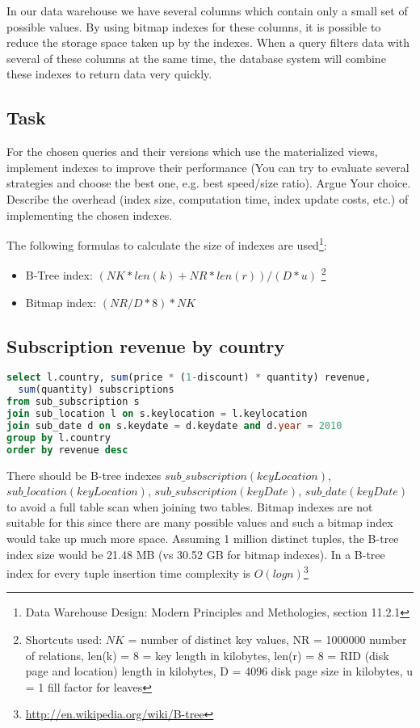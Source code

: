 In our data warehouse we have several columns which contain only a small set of possible values. By using bitmap indexes for these columns, it is possible to reduce the storage space taken up by the indexes. When a query filters data with several of these columns at the same time, the database system will combine these indexes to return data very quickly.


\subsection*{Task} 
For the chosen queries and their versions which use the materialized views,
implement indexes to improve their performance (You can try to evaluate
several strategies and choose the best one, e.g. best speed/size ratio).
Argue Your choice. Describe the overhead (index size, computation time,
index update costs, etc.) of implementing the chosen indexes.\newline

\noindent The following formulas to calculate the size of indexes are used\footnote{Data Warehouse Design: Modern Principles and Methologies, section 11.2.1}: 
\begin{itemize}
    \item B-Tree index: $(NK*len(k)+NR*len(r))/(D*u)$ \footnote{
Shortcuts used: $NK$ = number of distinct key values, NR = 1000000 number of relations, len(k) = 8 = key length in kilobytes, len(r) = 8 = RID (disk page and location) length in kilobytes, D = 4096 disk page size in kilobytes, u = 1 fill factor for leaves}
    \item Bitmap index: $(NR/D*8)*NK$
\end{itemize}

\subsection*{Subscription revenue by country} 
\begin{lstlisting}[language=sql]
select l.country, sum(price * (1-discount) * quantity) revenue, 
  sum(quantity) subscriptions 
from sub_subscription s 
join sub_location l on s.keylocation = l.keylocation 
join sub_date d on s.keydate = d.keydate and d.year = 2010
group by l.country 
order by revenue desc
\end{lstlisting}

There should be B-tree indexes $sub\_subscription(keyLocation)$, $sub\_location(keyLocation)$, $sub\_subscription(keyDate)$, $sub\_date(keyDate)$ to avoid a full table scan when joining two tables. 
Bitmap indexes are not suitable for this since there are many possible values and such a bitmap index would take up much more space. Assuming 1 million distinct tuples, the B-tree index size would be 21.48 MB (vs 30.52 GB for bitmap indexes). In a B-tree index for every tuple insertion time complexity is $O(log n)$\footnote{\url{http://en.wikipedia.org/wiki/B-tree}}

